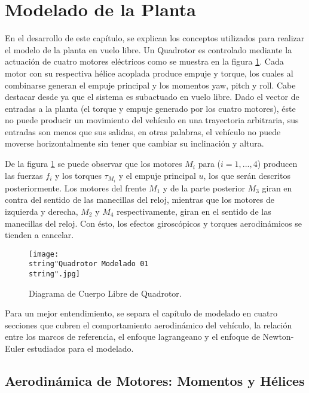 \documentclass[\main/main.tex]{subfiles}
\begin{document}
\section{Modelado de la Planta}\label{Modelado de la Planta}

En el desarrollo de este capítulo, se explican los conceptos utilizados
para realizar el modelo de la planta en vuelo libre. Un Quadrotor es controlado mediante
la actuación de cuatro motores eléctricos como se muestra en la figura
\ref{fig:Diagrama-de-Cuerpo }. Cada motor con su respectiva hélice
acoplada produce empuje y torque, los cuales al combinarse generan
el empuje principal y los momentos yaw, pitch y roll. Cabe destacar
desde ya que el sistema es subactuado en vuelo libre. Dado el vector de entradas
a la planta (el torque y empuje generado por los cuatro motores),
éste no puede producir un movimiento del vehículo en una trayectoria
arbitraria, sus entradas son menos que sus salidas, en otras palabras,
el vehículo no puede moverse horizontalmente sin tener que cambiar
su inclinación y altura. 

De la figura \ref{fig:Diagrama-de-Cuerpo } se puede observar que
los motores $M_{i}$ para ($i=1,...,4$) producen las fuerzas $f_{i}$
y los torques $\tau_{M_{i}}$ y el empuje principal $u$, los que serán
descritos posteriormente. Los motores del frente $M_{1}$ y de la
parte posterior $M_{3}$ giran en contra del sentido de las manecillas
del reloj, mientras que los motores de izquierda y derecha, $M_{2}$ y
$M_{4}$ respectivamente, giran en el sentido de las manecillas del
reloj. Con ésto, los efectos giroscópicos y torques aerodinámicos
se tienden a cancelar.

\begin{figure}[H]
\noindent \begin{centering}
\texttt{[image: \\string"Quadrotor Modelado 01\\string".jpg]}
\par\end{centering}
\caption{\label{fig:Diagrama-de-Cuerpo }Diagrama de Cuerpo Libre de Quadrotor.}
\end{figure}

\textcompwordmark{}

Para un mejor entendimiento, se separa el capítulo de modelado en
cuatro secciones que cubren el comportamiento aerodinámico del vehículo,
la relación entre los marcos de referencia, el enfoque lagrangeano y el enfoque de Newton-Euler estudiados para el modelado.


\subsection{Aerodinámica de Motores: Momentos y Hélices}
\end{document}
